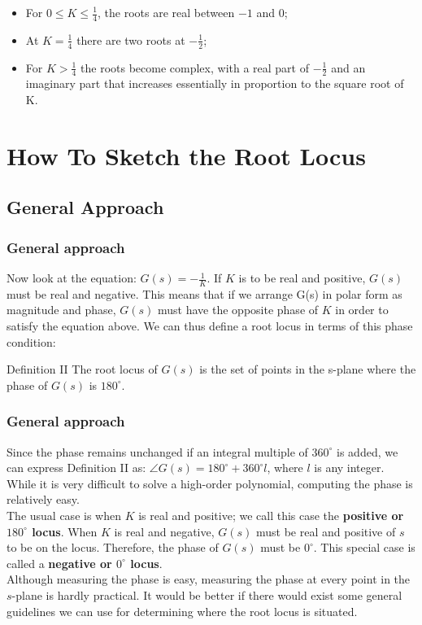 \begin{frame}
	\begin{exampleblock}{}
		\begin{itemize}
		\item For $0\leq K \leq \frac{1}{4}$, the roots are real between $-1$ and $0$;
		\item At $K = \frac{1}{4}$ there are two roots at $-\frac{1}{2}$;
		\item For $K>\frac{1}{4}$ the roots become complex, with a real part of $-\frac{1}{2}$ and an imaginary part that increases essentially in proportion to the square root of K.
		\end{itemize}
	\end{exampleblock}
\end{frame}

\section{How To Sketch the Root Locus}

\subsection{General Approach}

\begin{frame}
\frametitle{General approach}
\justify
	Now look at the equation: $G(s) = -\frac{1}{K}$. If $K$ is to be real and positive, $G(s)$ must be real and negative. This means that if we arrange G(s) in polar form as magnitude and phase, $G(s)$ must have the opposite phase of $K$ in order to satisfy the equation above. We can thus define a root locus in terms of this phase condition:  
	\vspace{0.5em}
	\begin{block}{Definition II}
		The root locus of $G(s)$ is the set of points in the s-plane where the phase of $G(s)$ is $180^{\circ}$.	
	\end{block}
\end{frame}

\begin{frame}
\frametitle{General approach}
\justify
	Since the phase remains unchanged if an integral multiple of $360^{\circ}$ is added, we can express Definition II as: $\angle G(s) = 180^{\circ} + 360^{\circ}l$, where $l$ is any integer. While it is very difficult to solve a high-order polynomial, computing the phase is relatively easy.\\
	\vspace{1em}
	The usual case is when $K$ is real and positive; we call this case the \textbf{positive or $180^{\circ}$ locus}. When $K$ is real and negative, $G(s)$ must be real and positive of $s$ to be on the locus. Therefore, the phase of $G(s)$ must be $0^{\circ}$. This special case is called a \textbf{negative or $0^{\circ}$ locus}.\\
	\vspace{1em}
	Although measuring the phase is easy, measuring the phase at every point in the $s$-plane is hardly practical. It would be better if there would exist some general guidelines we can use for determining where the root locus is situated.
\end{frame}

